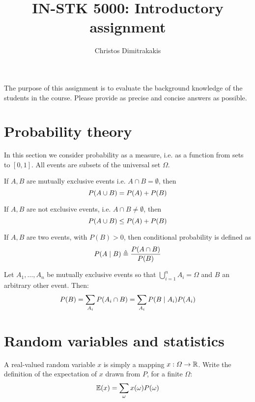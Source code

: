 \documentclass[a4paper]{article}
\title{IN-STK 5000: Introductory assignment}
\author{Christos Dimitrakakis}
\def\solution {0}
\begin{document}
\maketitle
The purpose of this assignment is to evaluate the background knowledge
of the students in the course. Please provide as precise and concise
answers as possible. 

\section{Probability theory}
In this section we consider probability as a measure, i.e. as a function from sets to $[0,1]$. All events are subsets of the universal set $\Omega$.
\begin{exercise}
  If $A, B$ are mutually exclusive events i.e. $A \cap B = \emptyset$,  then 
  \[
  P(A \cup B) =
  \ifdefined \solution
  P(A) + P(B)
  \else
  \ldots
  \fi
  \]
\end{exercise}
\begin{exercise}
  If $A, B$ are not exclusive events, i.e. $A \cap B \neq \emptyset$, then 
  \[
  P(A \cup B) \leq
  \ifdefined \solution
  P(A) + P(B)
  \else
  \ldots
  \fi
  \]
\end{exercise}

\begin{exercise}
  If $A, B$ are two events, with $P(B) > 0$, then conditional probability is defined as
  \[
  P(A \mid B) \defn 
  \ifdefined \solution
  \frac{P(A \cap B)}{P(B)}
  \else
  \ldots
  \fi
  \]
\end{exercise}

\begin{exercise}
  Let $A_1, \ldots, A_n$ be mutually exclusive events so that $\bigcup_{i=1}^n A_i = \Omega$ and $B$ an arbitrary other event. Then:
  \[
  P(B) = \sum_{A_i} 
  \ifdefined \solution
  P(A_i \cap B)
  =
  \sum_{A_i} 
  P(B \mid A_i)
  P(A_i )
  \else
  \ldots
  \fi
  \]
\end{exercise}

\section{Random variables and statistics}


\begin{exercise}
  A real-valued random variable $x$ is simply a mapping $x : \Omega \to {\mathbb{R}}$.
  Write the definition of the expectation of $x$ drawn from $P$, for a finite $\Omega$:
  \[
  \E(x) = 
  \ifdefined \solution
  \sum_{\omega} x(\omega) P(\omega) 
  \else
  \ldots
  \fi
  \]
\end{exercise}
\end{document}
